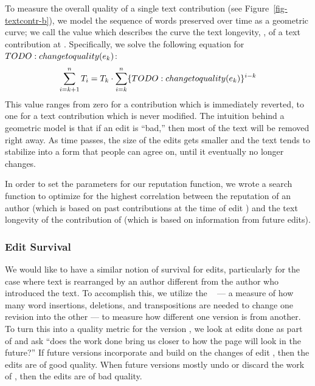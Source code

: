   To measure the overall quality of a single text contribution
  (see Figure~\ref{fig-textcontr-b}), we model the sequence of
  words preserved over time as a geometric curve; we call the
  value which describes the curve
  the text longevity, \tlong, of a text contribution at .
  Specifically, we solve the following equation for $TODO: change to quality(e_{k})$:
  \begin{equation*}
  	\sum_{i=k+1}^n T_i = T_k \cdot
		\sum_{i=k}^n \{ TODO: change to quality(e_{k}) \}^{i-k}
  \end{equation*}
  This value ranges from zero for a contribution which is immediately
  reverted, to one for a text contribution which is never modified.
  The intuition behind a geometric model is that if an edit is
  ``bad,'' then most of the text will be removed right away.
  As time passes, the size of the edits gets smaller and
  the text tends to stabilize into a form
  that people can agree on, until it eventually no longer changes.

  In order to set the parameters for our reputation function,
  we wrote a search function to optimize for the highest
  correlation between the reputation of an author (which is
  based on past contributions at the time of edit )
  and the text longevity of the contribution of 
  (which is based on information from future edits).

\subsubsection*{Edit Survival}

  We would like to have a similar notion of survival for edits,
  particularly for the case where text is rearranged by an author
  different from the author who introduced the text.
  To accomplish this, we utilize the
  ~\cite{Levenshtein66,TichyEditDist,EditDistanceMoves,Adler2007}
  --- a measure of how many word insertions, deletions,
  and transpositions are needed to change one revision into the other ---
  to measure how different one version is from another.
  To turn this into a quality metric for the
  version , we look at edits done as part of 
  and ask ``does the work done bring us closer to how the page
  will look in the future?''
  If future versions incorporate and build on the changes of edit ,
  then the edits are of good quality.
  When future versions mostly undo or discard the work of ,
  then the edits are of bad quality.

